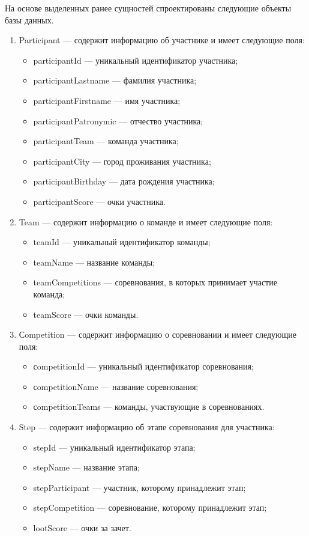 На основе выделенных ранее сущностей спроектированы следующие объекты базы данных.
\begin{enumerate}	
	\item Participant --- содержит информацию об участнике и имеет следующие поля:
	\begin{itemize}[label=---]
		\item participantId --- уникальный идентификатор участника;
		\item participantLastname --- фамилия участника;
		\item participantFirstname --- имя участника;
		\item participantPatronymic --- отчество участника;
		\item participantTeam --- команда участника;
		\item participantCity ---  город проживания участника;
		\item participantBirthday --- дата рождения участника;
		\item participantScore --- очки участника.
	\end{itemize}
	
	\item Team --- содержит информацию о команде и имеет следующие поля:
	\begin{itemize}[label=---]
		\item teamId --- уникальный идентификатор команды;
		\item teamName --- название команды;
		\item teamCompetitions --- соревнования, в которых принимает участие команда;
		\item teamScore --- очки команды.
	\end{itemize}
		
	\item Сompetition --- содержит информацию о соревновании и имеет следующие поля:
	\begin{itemize}[label=---]
		\item сompetitionId --- уникальный идентификатор соревнования;
		\item сompetitionName --- название соревнования;
		\item сompetitionTeams --- команды, участвующие в соревнованиях. 
	\end{itemize}	
	
	\item Step --- содержит информацию об этапе соревнования для участника:
	\begin{itemize}[label=---]
		\item stepId --- уникальный идентификатор этапа;
		\item stepName --- название этапа;
		\item stepParticipant --- участник, которому принадлежит этап; 
		\item stepCompetition --- соревнование, которому принадлежит этап; 
		\item lootScore --- очки за зачет.
	\end{itemize}
	

\end{enumerate}
